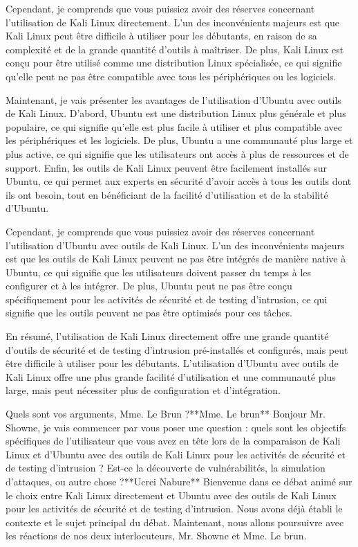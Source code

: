 Cependant, je comprends que vous puissiez avoir des réserves concernant l'utilisation de Kali Linux directement. L'un des inconvénients majeurs est que Kali Linux peut être difficile à utiliser pour les débutants, en raison de sa complexité et de la grande quantité d'outils à maîtriser. De plus, Kali Linux est conçu pour être utilisé comme une distribution Linux spécialisée, ce qui signifie qu'elle peut ne pas être compatible avec tous les périphériques ou les logiciels.

Maintenant, je vais présenter les avantages de l'utilisation d'Ubuntu avec outils de Kali Linux. D'abord, Ubuntu est une distribution Linux plus générale et plus populaire, ce qui signifie qu'elle est plus facile à utiliser et plus compatible avec les périphériques et les logiciels. De plus, Ubuntu a une communauté plus large et plus active, ce qui signifie que les utilisateurs ont accès à plus de ressources et de support. Enfin, les outils de Kali Linux peuvent être facilement installés sur Ubuntu, ce qui permet aux experts en sécurité d'avoir accès à tous les outils dont ils ont besoin, tout en bénéficiant de la facilité d'utilisation et de la stabilité d'Ubuntu.

Cependant, je comprends que vous puissiez avoir des réserves concernant l'utilisation d'Ubuntu avec outils de Kali Linux. L'un des inconvénients majeurs est que les outils de Kali Linux peuvent ne pas être intégrés de manière native à Ubuntu, ce qui signifie que les utilisateurs doivent passer du temps à les configurer et à les intégrer. De plus, Ubuntu peut ne pas être conçu spécifiquement pour les activités de sécurité et de testing d'intrusion, ce qui signifie que les outils peuvent ne pas être optimisés pour ces tâches.

En résumé, l'utilisation de Kali Linux directement offre une grande quantité d'outils de sécurité et de testing d'intrusion pré-installés et configurés, mais peut être difficile à utiliser pour les débutants. L'utilisation d'Ubuntu avec outils de Kali Linux offre une plus grande facilité d'utilisation et une communauté plus large, mais peut nécessiter plus de configuration et d'intégration.

Quels sont vos arguments, Mme. Le Brun ?**Mme. Le brun**
Bonjour Mr. Showne, je vais commencer par vous poser une question : quels sont les objectifs spécifiques de l'utilisateur que vous avez en tête lors de la comparaison de Kali Linux et d'Ubuntu avec des outils de Kali Linux pour les activités de sécurité et de testing d'intrusion ? Est-ce la découverte de vulnérabilités, la simulation d'attaques, ou autre chose ?**Ucrei Nabure**
Bienvenue dans ce débat animé sur le choix entre Kali Linux directement et Ubuntu avec des outils de Kali Linux pour les activités de sécurité et de testing d'intrusion. Nous avons déjà établi le contexte et le sujet principal du débat. Maintenant, nous allons poursuivre avec les réactions de nos deux interlocuteurs, Mr. Showne et Mme. Le brun.

